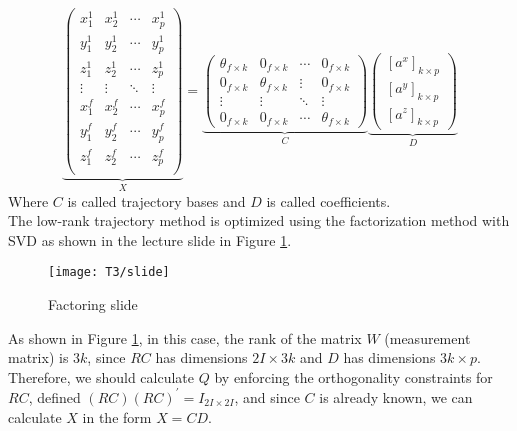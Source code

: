 \begin{equation}\label{eq:shape_trajectory}	
	\underbrace{\begin{pmatrix}
		x_{1}^{1} & x_{2}^{1} & \cdots & x_{p}^{1}\\
		y_{1}^{1} & y_{2}^{1} & \cdots & y_{p}^{1}\\
		z_{1}^{1} & z_{2}^{1} & \cdots & z_{p}^{1}\\
		\vdots & \vdots & \ddots & \vdots \\
		x_{1}^{f} & x_{2}^{f} & \cdots & x_{p}^{f}\\
		y_{1}^{f} & y_{2}^{f} & \cdots & y_{p}^{f}\\
		z_{1}^{f} & z_{2}^{f} & \cdots & z_{p}^{f}\\
	\end{pmatrix}}_{X}=
	\underbrace{\begin{pmatrix}
		\theta_{f\times k} & 0_{f\times k} & \cdots & 0_{f\times k} \\		
		0_{f\times k} &  \theta_{f\times k} & \vdots & 0_{f\times k}\\
		\vdots &  \vdots &\ddots & \vdots \\
		0_{f\times k} & 0_{f\times k} &  \cdots & \theta_{f\times k}		
	\end{pmatrix}}_{C}
	\underbrace{\begin{pmatrix}
				[a^{x}]_{k\times p} \\		
				[a^{y}]_{k\times p} \\
				[a^{z}]_{k\times p}				
		\end{pmatrix}}_{D}
\end{equation} 
\noindent Where $C$ is called trajectory bases and $D$ is called coefficients.\\

\noindent The low-rank trajectory method is optimized using the factorization method with SVD as shown in the lecture slide in Figure \ref{fig:slideT3}.\\

\begin{figure}[h]
	\centering
	\texttt{[image: T3/slide]}
	\caption{Factoring slide}
	\label{fig:slideT3}
\end{figure}

\noindent As shown in Figure \ref{fig:slideT3}, in this case, the rank of the matrix $W$ (measurement matrix) is $3k$, since $RC$ has dimensions $2I\times 3k$ and $D$ has dimensions $3k\times p$. Therefore, we should calculate $Q$ by enforcing the orthogonality constraints for $RC$, defined $(RC)(RC)^{'}=I_{2I\times 2I}$, and since $C$ is already known, we can calculate $X$ in the form $X=CD$.\\ 

